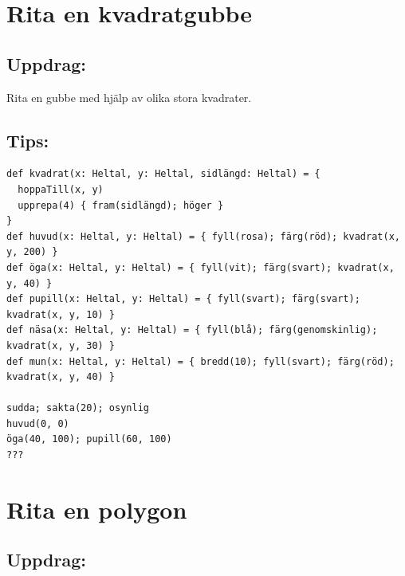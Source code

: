 \chapter{Rita en kvadratgubbe}\section*{\color{BrickRed}Uppdrag:}
Rita en gubbe med hjälp av olika stora kvadrater.
\\


  
\section*{\color{OliveGreen}Tips:}

\begin{lstlisting}[basicstyle={\ttfamily\fontsize{14}{17}\selectfont},numbers=none]
def kvadrat(x: Heltal, y: Heltal, sidlängd: Heltal) = {
  hoppaTill(x, y)
  upprepa(4) { fram(sidlängd); höger }
}
def huvud(x: Heltal, y: Heltal) = { fyll(rosa); färg(röd); kvadrat(x, y, 200) }
def öga(x: Heltal, y: Heltal) = { fyll(vit); färg(svart); kvadrat(x, y, 40) }
def pupill(x: Heltal, y: Heltal) = { fyll(svart); färg(svart); kvadrat(x, y, 10) }
def näsa(x: Heltal, y: Heltal) = { fyll(blå); färg(genomskinlig); kvadrat(x, y, 30) }
def mun(x: Heltal, y: Heltal) = { bredd(10); fyll(svart); färg(röd); kvadrat(x, y, 40) }

sudda; sakta(20); osynlig
huvud(0, 0)
öga(40, 100); pupill(60, 100)
???
\end{lstlisting}
        
\chapter{Rita en polygon}\section*{\color{BrickRed}Uppdrag:}


